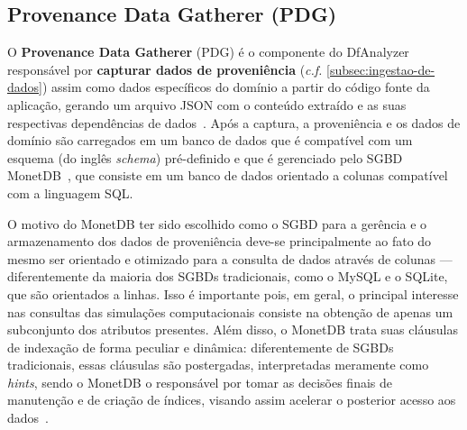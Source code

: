 
\subsection{Provenance Data Gatherer (PDG)}

O \textbf{Provenance Data Gatherer} (PDG) é o componente do DfAnalyzer responsável por \textbf{capturar dados de proveniência} (\textit{c.f.} \autoref{subsec:ingestao-de-dados}) assim como dados específicos do domínio a partir do código fonte da aplicação, gerando um arquivo JSON com o conteúdo extraído e as suas respectivas dependências de dados~\cite{silva2016situ}. Após a captura, a proveniência e os dados de domínio são carregados em um banco de dados que é compatível com um esquema (do inglês \textit{schema}) pré-definido e que é gerenciado pelo SGBD MonetDB~\cite{boncz2008breaking}, que consiste em um banco de dados orientado a colunas compatível com a linguagem SQL.

O motivo do MonetDB ter sido escolhido como o SGBD para a gerência e o armazenamento dos dados de proveniência deve-se principalmente ao fato do mesmo ser orientado e otimizado para a consulta de dados através de colunas --- diferentemente da maioria dos SGBDs tradicionais, como o MySQL e o SQLite, que são orientados a linhas. Isso é importante pois, em geral, o principal interesse nas consultas das simulações computacionais consiste na obtenção de apenas um subconjunto dos atributos presentes.
Além disso, o MonetDB trata suas cláusulas de indexação de forma peculiar e dinâmica: diferentemente de SGBDs tradicionais, essas cláusulas são postergadas, interpretadas meramente como \textit{hints}, sendo o MonetDB o responsável por tomar as decisões finais de manutenção e de criação de índices, visando assim acelerar o posterior acesso aos dados~\cite{url:monetdb}.

